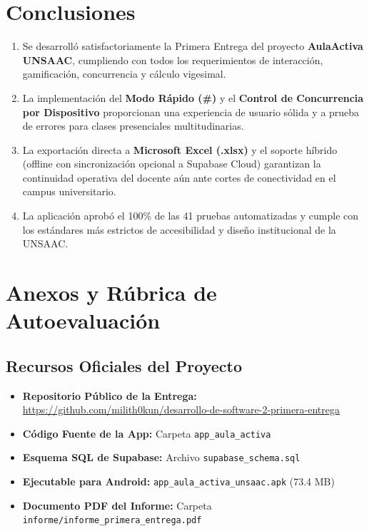 \documentclass[12pt,a4paper]{article}
\begin{document}
\section{Conclusiones}

\begin{enumerate}
    \item Se desarrolló satisfactoriamente la Primera Entrega del proyecto \textbf{AulaActiva UNSAAC}, cumpliendo con todos los requerimientos de interacción, gamificación, concurrencia y cálculo vigesimal.
    \item La implementación del \textbf{Modo Rápido (\#)} y el \textbf{Control de Concurrencia por Dispositivo} proporcionan una experiencia de usuario sólida y a prueba de errores para clases presenciales multitudinarias.
    \item La exportación directa a \textbf{Microsoft Excel (.xlsx)} y el soporte híbrido (offline con sincronización opcional a Supabase Cloud) garantizan la continuidad operativa del docente aún ante cortes de conectividad en el campus universitario.
    \item La aplicación aprobó el 100\% de las 41 pruebas automatizadas y cumple con los estándares más estrictos de accesibilidad y diseño institucional de la UNSAAC.
\end{enumerate}

\section{Anexos y Rúbrica de Autoevaluación}

\subsection{Recursos Oficiales del Proyecto}
\begin{itemize}
    \item \textbf{Repositorio Público de la Entrega:} \href{https://github.com/milith0kun/desarrollo-de-software-2-primera-entrega}{https://github.com/milith0kun/desarrollo-de-software-2-primera-entrega}
    \item \textbf{Código Fuente de la App:} Carpeta \texttt{app\_aula\_activa}
    \item \textbf{Esquema SQL de Supabase:} Archivo \texttt{supabase\_schema.sql}
    \item \textbf{Ejecutable para Android:} \texttt{app\_aula\_activa\_unsaac.apk} (73.4 MB)
    \item \textbf{Documento PDF del Informe:} Carpeta \texttt{informe/informe\_primera\_entrega.pdf}
\end{itemize}
\end{document}
